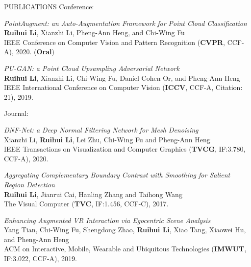 \documentclass[UTF8]{cv} %
\begin{document}
\begin{rSection}{PUBLICATIONS}
\hspace{-7mm} Conference:

\begin{etaremune}[itemindent=0.00em]
    \renewcommand\labelenumi{[C\theenumi]}
    \item  \emph{PointAugment: an Auto-Augmentation Framework for Point Cloud Classification}
\\    \textbf{Ruihui Li}, Xianzhi Li, Pheng-Ann Heng, and Chi-Wing Fu
\\    IEEE Conference on Computer Vision and Pattern Recognition (\textbf{CVPR}, CCF-A), 2020. (\textbf{Oral})
    \item  \emph{PU-GAN: a Point Cloud Upsampling Adversarial Network}
\\    \textbf{Ruihui Li}, Xianzhi Li, Chi-Wing Fu, Daniel Cohen-Or, and Pheng-Ann Heng
\\    IEEE International Conference on Computer Vision (\textbf{ICCV}, CCF-A, Citation: 21), 2019.
 
\end{etaremune}


\hspace{-7mm} Journal:

\begin{etaremune}[itemindent=0.00em]
    \renewcommand\labelenumi{[J\theenumi]}
    \item  \emph{DNF-Net: a Deep Normal Filtering Network for Mesh Denoising}
\\    Xianzhi Li, \textbf{Ruihui Li}, Lei Zhu, Chi-Wing Fu and Pheng-Ann Heng
\\    IEEE Transactions on Visualization and Computer Graphics  (\textbf{TVCG}, IF:3.780, CCF-A), 2020.
    \item  \emph{Aggregating Complementary Boundary Contrast with Smoothing for Salient Region Detection}
\\    \textbf{Ruihui Li}, Jianrui Cai, Hanling Zhang and Taihong Wang
\\    The Visual Computer (\textbf{TVC}, IF:1.456, CCF-C), 2017.
    \item \emph{Enhancing Augmented VR Interaction via Egocentric Scene Analysis}
\\  Yang Tian, Chi-Wing Fu, Shengdong Zhao, \textbf{Ruihui Li}, Xiao Tang, Xiaowei Hu, and Pheng-Ann Heng
\\ACM on Interactive, Mobile, Wearable and Ubiquitous Technologies (\textbf{IMWUT}, IF:3.022, CCF-A), 2019.
\end{etaremune}


\end{rSection}
\end{document}
